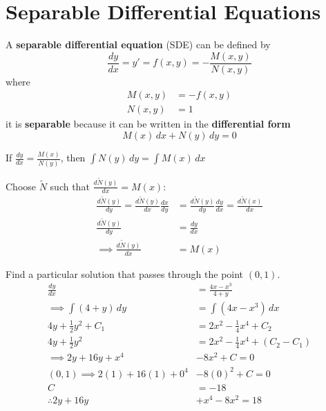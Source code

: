\documentclass[twoside]{report}
\begin{document}
    \section{Separable Differential Equations}
    \begin{definition}
        A \textbf{separable differential equation} (SDE) can be defined by
        \begin{equation}
            \frac{dy}{dx}=y'=f(x, y)=-\frac{M(x, y)}{N(x, y)}
        \end{equation}
        where
        \begin{align}
            M(x, y) &= - f(x, y)\\
            N(x, y) &= 1
        \end{align}
        it is \textbf{separable} because it can be written in the \textbf{differential form}
        \begin{equation}
            M(x)\,dx+N(y)\,dy=0
        \end{equation}
    \end{definition}
    \begin{btheorem}
        If $\frac{dy}{dx} = \frac{M(x)}{N(y)}$, then $\int N(y)\,dy=\int M(x)\,dx$
    \end{btheorem}
    \begin{bproof}
        Choose $\widetilde{N}$ such that $\frac{d\widetilde{N}(y)}{dx} = M(x)$:
    \begin{align}
        \frac{d\widetilde{N}(y)}{dy} = \frac{d\widetilde{N}(y)}{dx}\frac{dx}{dy} &= \frac{d\widetilde{N}(y)}{dy}\frac{dy}{dx}= \frac{d\widetilde{N}(x)}{dx}\\
        \frac{d\widetilde{N}(y)}{dy} &= \frac{dy}{dx}
        \\
        \implies \frac{d\widetilde{N}(y)}{dx} &= M(x)
    \end{align}
    \end{bproof}
    \np
    \begin{example}
        Find a particular solution that passes through the point $(0, 1)$.
        \begin{align}
            \frac{dy}{dx} &= \frac{4x-x^{3}}{4 + y}\\
            \implies \int (4 + y)\,dy &= \int(4x-x^{3})\,dx\\
            4y+\frac{1}{2}y^{2} + C_1 &= 2 x^{2}-\frac{1}{4}x^{4} + C_2\\
            4y + \frac{1}{2} y^{2} &= 2 x^{2} - \frac{1}{4} x^{4} + (C_2 - C_1)\\
            \implies 2y + 16y + x^{4} &- 8x^{2} + C = 0\\
            (0, 1) \implies 2(1) + 16(1) + 0^{4} &- 8(0)^{2} + C = 0\\
            C &= -18\\
            \therefore 2y + 16y &+ x^{4} - 8x^{2} = 18
        \end{align}
    \end{example}
\end{document}
